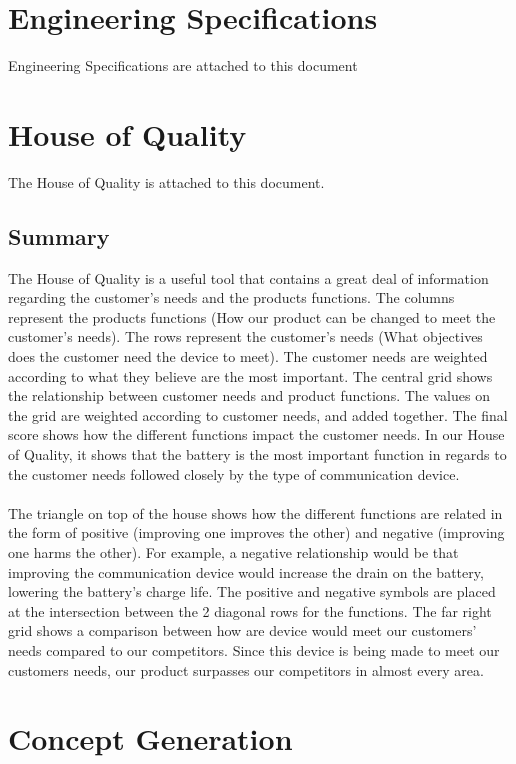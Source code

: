 \documentclass[12pt]{article}
\begin{document}
\section{Engineering Specifications}
Engineering Specifications are attached to this document

\section{House of Quality}
The House of Quality is attached to this document.

\subsection{Summary}
The House of Quality is a useful tool that contains a great deal of information regarding the customer’s needs and the products functions.  The columns represent the products functions (How our product can be changed to meet the customer’s needs). The rows represent the customer’s needs (What objectives does the customer need the device to meet).  The customer needs are weighted according to what they believe are the most important.  The central grid shows the relationship between customer needs and product functions.  The values on the grid are weighted according to customer needs, and added together.  The final score shows how the different functions impact the customer needs.  In our House of Quality, it shows that the battery is the most important function in regards to the customer needs followed closely by the type of communication device.\\  \\
The triangle on top of the house shows how the different functions are related in the form of positive (improving one improves the other) and negative (improving one harms the other). For example, a negative relationship would be that improving the communication device would increase the drain on the battery, lowering the battery’s charge life.  The positive and negative symbols are placed at the intersection between the 2 diagonal rows for the functions.
The far right grid shows a comparison between how are device would meet our customers’ needs compared to our competitors.  Since this device is being made to meet our customers needs, our product surpasses our competitors in almost every area.


\section{Concept Generation}
\end{document}

